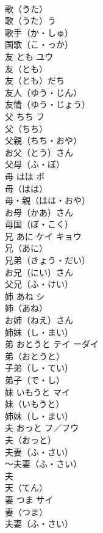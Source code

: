 \documentclass[8pt]{extreport}
\begin{document}
\begin{CJK}{UTF8}{min}
\\	歌（うた）　
\\	歌（うた）う　
\\	歌手（か・しゅ）　
\\	国歌（こ・っか）　
\\	友	とも	ユウ	
\\	友（とも）
\\	友（とも）だち　
\\	友人（ゆう・じん）　
\\	友情（ゆう・じょう）　
\\	父	ちち	フ	
\\	父（ちち）　
\\	父親（ちち・おや）　
\\	お父（とう）さん　
\\	父母（ふ・ぼ）　
\\	母	はは	ボ	
\\	母（はは）　
\\	母・親（はは・おや）　
\\	お母（かあ）さん　
\\	母国（ぼ・こく）　
\\	兄	あに	ケイ キョウ	
\\	兄（あに）　
\\	兄弟（きょう・だい）　
\\	お兄（にい）さん　
\\	父兄（ふ・けい）　
\\	姉	あね	シ	
\\	姉（あね）　
\\	お姉（ねえ）さん　
\\	姉妹（し・まい）　
\\	弟	おとうと	テイ ーダイ	
\\	弟（おとうと）　
\\	子弟（し・てい）　
\\	弟子（で・し）　
\\	妹	いもうと	マイ	
\\	妹（いもうと）　
\\	姉妹（し・まい）　
\\	夫	おっと	フ／フウ	
\\	夫（おっと）　
\\	夫妻（ふ・さい）　
\\	～夫妻（ふ・さい）　
\\	夫
\\	天（てん） 
\\	妻	つま	サイ	
\\	妻（つま）　
\\	夫妻（ふ・さい）　

\end{CJK}
\end{document}
